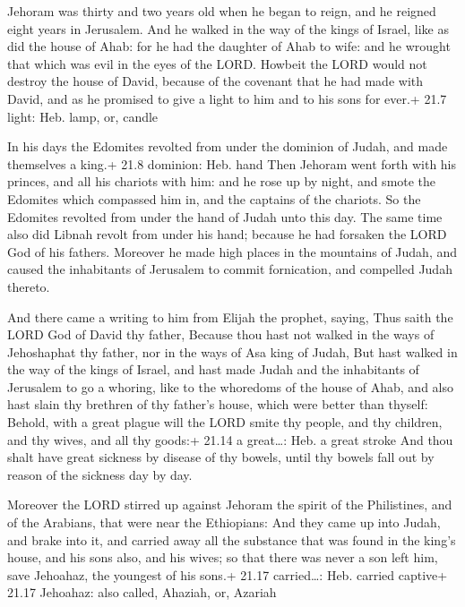  Jehoram was thirty and two years old when he began to
reign, and he reigned eight years in Jerusalem.  And he
walked in the way of the kings of Israel, like as did the house of Ahab:
for he had the daughter of Ahab to wife: and he wrought that which was
evil in the eyes of the LORD.  Howbeit the LORD would not
destroy the house of David, because of the covenant that he had made
with David, and as he promised to give a light to him and to his sons
for ever.+ 21.7 light: Heb. lamp, or, candle

 In his days the Edomites revolted from under the dominion
of Judah, and made themselves a king.+ 21.8 dominion: Heb. hand
 Then Jehoram went forth with his princes, and all his
chariots with him: and he rose up by night, and smote the Edomites which
compassed him in, and the captains of the chariots.  So the
Edomites revolted from under the hand of Judah unto this day. The same
time also did Libnah revolt from under his hand; because he had forsaken
the LORD God of his fathers.  Moreover he made high places
in the mountains of Judah, and caused the inhabitants of Jerusalem to
commit fornication, and compelled Judah thereto.

 And there came a writing to him from Elijah the prophet,
saying, Thus saith the LORD God of David thy father, Because thou hast
not walked in the ways of Jehoshaphat thy father, nor in the ways of Asa
king of Judah,  But hast walked in the way of the kings of
Israel, and hast made Judah and the inhabitants of Jerusalem to go a
whoring, like to the whoredoms of the house of Ahab, and also hast slain
thy brethren of thy father's house, which were better than thyself:
 Behold, with a great plague will the LORD smite thy
people, and thy children, and thy wives, and all thy goods:+ 21.14 a
great\ldots: Heb. a great stroke  And thou shalt have great
sickness by disease of thy bowels, until thy bowels fall out by reason
of the sickness day by day.

 Moreover the LORD stirred up against Jehoram the spirit
of the Philistines, and of the Arabians, that were near the Ethiopians:
 And they came up into Judah, and brake into it, and
carried away all the substance that was found in the king's house, and
his sons also, and his wives; so that there was never a son left him,
save Jehoahaz, the youngest of his sons.+ 21.17 carried\ldots: Heb.
carried captive+ 21.17 Jehoahaz: also called, Ahaziah, or, Azariah

